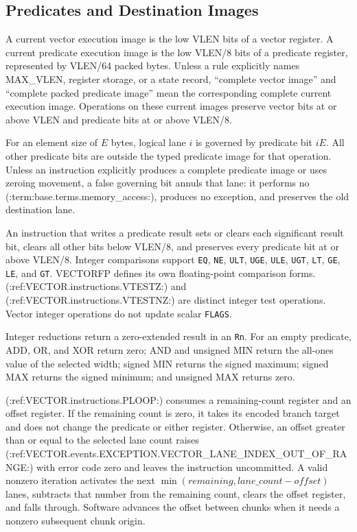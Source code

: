 \subsection{Predicates and Destination Images}

A current vector execution image is the low VLEN bits of a vector register. A
current predicate execution image is the low VLEN/8 bits of a predicate
register, represented by VLEN/64 packed bytes. Unless a rule explicitly names
MAX\_VLEN, register storage, or a state record, ``complete vector image'' and
``complete packed predicate image'' mean the corresponding complete current
execution image. Operations on these current images preserve vector bits at or
above VLEN and predicate bits at or above VLEN/8.

For an element size of $E$ bytes, logical lane $i$ is governed by predicate
bit $iE$.  All other predicate bits are outside the typed predicate image for
that operation.
Unless an instruction explicitly produces a complete predicate image or uses
zeroing movement, a false governing bit annuls that lane: it performs no
(:term:base.terms.memory_access:), produces no exception, and preserves the old destination lane.

An instruction that writes a predicate result sets or clears each significant
result bit, clears all other bits below VLEN/8, and preserves every predicate
bit at or above VLEN/8. Integer comparisons support \texttt{EQ},
\texttt{NE}, \texttt{ULT}, \texttt{UGE}, \texttt{ULE}, \texttt{UGT},
\texttt{LT}, \texttt{GE}, \texttt{LE}, and \texttt{GT}. VECTORFP defines its
own floating-point comparison forms.
(:ref:VECTOR.instructions.VTESTZ:) and (:ref:VECTOR.instructions.VTESTNZ:) are distinct integer test operations.
Vector integer operations do not update scalar \texttt{FLAGS}.

Integer reductions return a zero-extended result in an \texttt{Rn}.  For an
empty predicate, ADD, OR, and XOR return zero; AND and unsigned MIN return the
all-ones value of the selected width; signed MIN returns the signed maximum;
signed MAX returns the signed minimum; and unsigned MAX returns zero.

(:ref:VECTOR.instructions.PLOOP:) consumes a remaining-count register and an offset register.  If
the remaining count is zero, it takes its encoded branch target and does not
change the predicate or either register.  Otherwise, an offset greater than
or equal to the selected lane count raises (:ref:VECTOR.events.EXCEPTION.VECTOR_LANE_INDEX_OUT_OF_RANGE:) with
error code zero and leaves the instruction uncommitted.  A valid nonzero
iteration activates the next
$\min(remaining, lane\_count-offset)$ lanes, subtracts that number from the
remaining count, clears the offset register, and falls through.  Software
advances the offset between chunks when it needs a nonzero subsequent chunk
origin.

